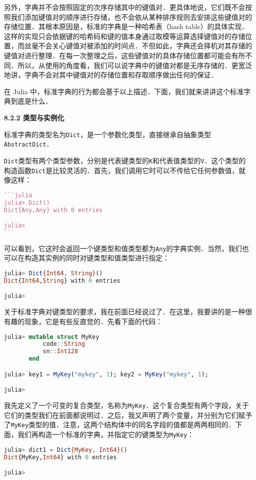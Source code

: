 另外，字典并不会按照固定的次序存储其中的键值对．更具体地说，它们既不会按照我们添加键值对的顺序进行存储，也不会依从某种排序规则去安排这些键值对的存储位置．其根本原因是，标准的字典是一种哈希表（hash table）的具体实现．这样的实现只会依据键的哈希码和键的值本身通过取模等运算选择键值对的存储位置，而丝毫不会关心键值对被添加的时间点．不但如此，字典还会择机对其存储的键值对进行整理．在每一次整理之后，这些键值对的具体存储位置都可能会有所不同．所以，从使用的角度看，我们可以说字典中的键值对都是无序存储的．更宽泛地讲，字典不会对其中键值对的存储位置和存取顺序做出任何的保证．

在 Julia 中，标准字典的行为都会基于以上描述．下面，我们就来讲讲这个标准字典到底是什么．

\textbf{8.2.2 类型与实例化}

标准字典的类型名为\verb|Dict|，是一个参数化类型，直接继承自抽象类型\verb|AbstractDict|．

\verb|Dict|类型有两个类型参数，分别是代表键类型的\verb|K|和代表值类型的\verb|V|．这个类型的构造函数\verb|Dict|是比较灵活的．首先，我们调用它时可以不传给它任何参数值，就像这样：
\begin{lstlisting}[language=julia]
```julia
julia> Dict()
Dict{Any,Any} with 0 entries

julia> 
```
\end{lstlisting}

可以看到，它这时会返回一个键类型和值类型都为\verb|Any|的字典实例．当然，我们也可以在构造其实例的同时对键类型和值类型进行指定：
\begin{lstlisting}[language=julia]
julia> Dict{Int64, String}()
Dict{Int64,String} with 0 entries

julia> 
\end{lstlisting}

关于标准字典对键类型的要求，我在前面已经说过了．在这里，我要讲的是一种很有趣的现象，它是有些反直觉的．先看下面的代码：
\begin{lstlisting}[language=julia]
julia> mutable struct MyKey
           code::String
           sn::Int128
       end

julia> key1 = MyKey("mykey", 1); key2 = MyKey("mykey", 1);

julia> 
\end{lstlisting}

我先定义了一个可变的复合类型，名称为\verb|MyKey|．这个复合类型有两个字段，关于它们的类型我们在前面都说明过．之后，我又声明了两个变量，并分别为它们赋予了\verb|MyKey|类型的值．注意，这两个结构体中的同名字段的值都是两两相同的．下面，我们再构造一个标准的字典，并指定它的键类型为\verb|MyKey|：
\begin{lstlisting}[language=julia]
julia> dict1 = Dict{MyKey, Int64}()
Dict{MyKey,Int64} with 0 entries

julia> 
\end{lstlisting}

